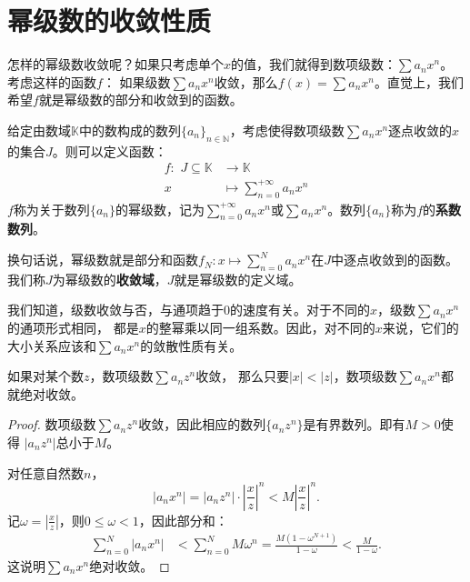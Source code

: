 \documentclass[12pt,UTF8]{ctexbook}
\begin{document}
\section{幂级数的收敛性质}

怎样的幂级数收敛呢？如果只考虑单个$x$的值，我们就得到数项级数：$\sum a_n x^n$。考虑这样的函数$f$：
如果级数$\sum a_n x^n$收敛，那么$f(x) = \sum a_n x^n$。直觉上，我们希望$f$就是幂级数的部分和收敛到的函数。

\begin{df}
    给定由数域$\mathbb{K}$中的数构成的数列$\{a_n\}_{n\in\mathbb{N}}$，考虑使得数项级数$\sum a_n x^n$逐点收敛的$x$的集合$J$。则可以定义函数：
    $$
    \begin{array}{rl}
        f: \,\, J\subseteq \mathbb{K} &\rightarrow \mathbb{K} \\
        x &\displaystyle \mapsto \sum_{n=0}^{+\infty} a_n x^n        
    \end{array}
    $$
    $f$称为关于数列$\{a_n\}$的幂级数，记为$\sum_{n=0}^{+\infty} a_n x^n$或$\sum a_n x^n$。数列$\{a_n\}$称为$f$的\textbf{系数数列}。
\end{df}
换句话说，幂级数就是部分和函数$f_N : x\mapsto \sum_{n=0}^{N} a_n x^n$在$J$中逐点收敛到的函数。
我们称$J$为幂级数的\textbf{收敛域}，$J$就是幂级数的定义域。

我们知道，级数收敛与否，与通项趋于$0$的速度有关。对于不同的$x$，级数$\sum a_n x^n$的通项形式相同，
都是$x$的整幂乘以同一组系数。因此，对不同的$x$来说，它们的大小关系应该和$\sum a_n x^n$的敛散性质有关。

\begin{tm}\label{tm:1-1-0}
    如果对某个数$z$，数项级数$\sum a_n z^n$收敛，
    那么只要$|x|<|z|$，数项级数$\sum a_n x^n$都就绝对收敛。
\end{tm}

\begin{proof}
    数项级数$\sum a_n z^n$收敛，因此相应的数列$\{a_n z^n\}$是有界数列。即有$M>0$使得
    $|a_n z^n|$总小于$M$。

    对任意自然数$n$，
    $$ |a_n x^n| = |a_n z^n| \cdot \left|\frac{x}{z}\right|^n < M \left|\frac{x}{z}\right|^n. $$
    记$\displaystyle \omega = \left|\frac{x}{z}\right|$，则$0\leqslant \omega<1$，因此部分和：
    \begin{align*}
        \sum_{n=0}^N |a_n x^n| &< \sum_{n=0}^N M \omega^n = \frac{M(1 - \omega^{N+1})}{1 - \omega} < \frac{M}{1 - \omega}.
    \end{align*}
    这说明$\sum a_n x^n$绝对收敛。

\end{proof}
\end{document}
